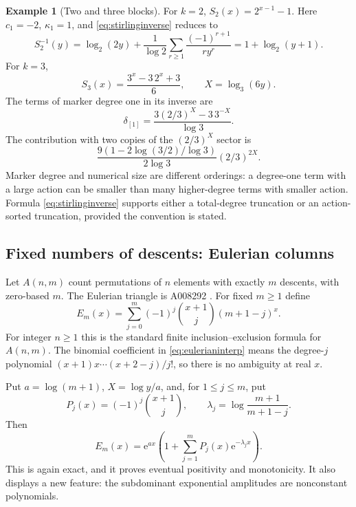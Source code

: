 \documentclass[11pt,a4paper]{article}
\theoremstyle{definition}
\newtheorem{example}[theorem]{Example}
\theoremstyle{remark}
\newcommand{\ee}{\mathrm e}
\numberwithin{equation}{section}
\begin{document}
\begin{example}[Two and three blocks]
For $k=2$, $S_2(x)=2^{x-1}-1$. Here $c_1=-2$, $\kappa_1=1$, and \eqref{eq:stirlinginverse} reduces to
\[
 S_2^{-1}(y)=\log_2(2y)+\frac1{\log2}
 \sum_{r\ge1}\frac{(-1)^{r+1}}{r y^r}
 =1+\log_2(y+1).
\]
For $k=3$,
\[
 S_3(x)=\frac{3^x-3\,2^x+3}{6},\qquad X=\log_3(6y).
\]
The terms of marker degree one in its inverse are
\begin{equation}
 \delta_{[1]}=\frac{3(2/3)^X-3\,3^{-X}}{\log3}.
 \label{eq:stirling3first}
\end{equation}
The contribution with two copies of the $(2/3)^X$ sector is
\[
 \frac{9(1-2\log(3/2)/\log3)}{2\log3}(2/3)^{2X}.
\]
Marker degree and numerical size are different orderings: a degree-one term with a large action can be smaller than many higher-degree terms with smaller action. Formula \eqref{eq:stirlinginverse} supports either a total-degree truncation or an action-sorted truncation, provided the convention is stated.
\end{example}

\subsection{Fixed numbers of descents: Eulerian columns}
Let $A(n,m)$ count permutations of $n$ elements with exactly $m$ descents, with zero-based $m$. The Eulerian triangle is A008292 \cite{oeiseulerian}. For fixed $m\ge1$ define
\begin{equation}
 E_m(x)=\sum_{j=0}^m(-1)^j\binom{x+1}{j}(m+1-j)^x.
 \label{eq:eulerianinterp}
\end{equation}
For integer $n\ge1$ this is the standard finite inclusion--exclusion formula for $A(n,m)$. The binomial coefficient in \eqref{eq:eulerianinterp} means the degree-$j$ polynomial $(x+1)x\cdots(x+2-j)/j!$, so there is no ambiguity at real $x$.

Put $a=\log(m+1)$, $X=\log y/a$, and, for $1\le j\le m$, put
\[
 P_j(x)=(-1)^j\binom{x+1}{j},\qquad
 \lambda_j=\log\frac{m+1}{m+1-j}.
\]
Then
\begin{equation}
 E_m(x)=\ee^{ax}\left(1+\sum_{j=1}^mP_j(x)\ee^{-\lambda_jx}\right).
 \label{eq:eulerianforward}
\end{equation}
This is again exact, and it proves eventual positivity and monotonicity. It also displays a new feature: the subdominant exponential amplitudes are nonconstant polynomials.
\end{document}
